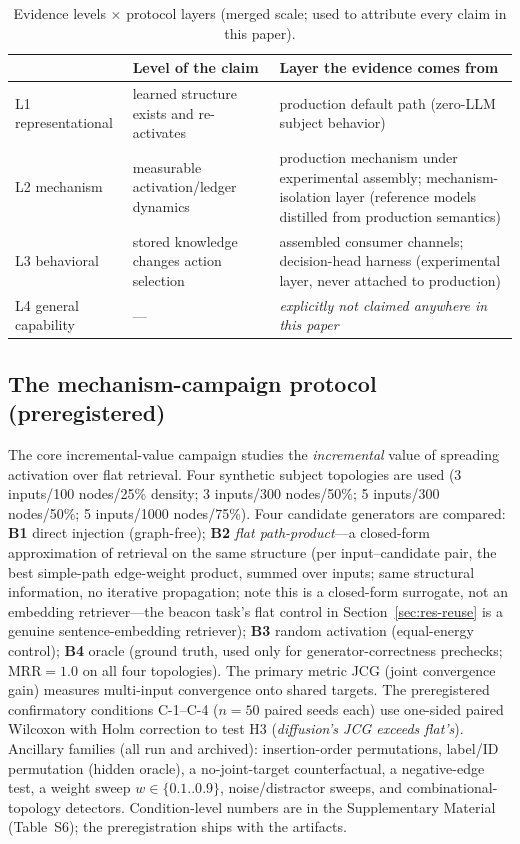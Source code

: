\documentclass[10pt,a4paper]{article}
\begin{document}
\begin{table}[t]
\centering\small
\caption{Evidence levels $\times$ protocol layers (merged scale; used to attribute every claim in this paper).}
\label{tab:evidence}
\begin{tabular}{L{3.2cm}L{4.4cm}L{6.4cm}}
\toprule
 & \textbf{Level of the claim} & \textbf{Layer the evidence comes from} \\
\midrule
L1 representational & learned structure exists and re-activates & production default path (zero-LLM subject behavior) \\
L2 mechanism & measurable activation/ledger dynamics & production mechanism under experimental assembly; mechanism-isolation layer (reference models distilled from production semantics) \\
L3 behavioral & stored knowledge changes action selection & assembled consumer channels; decision-head harness (experimental layer, never attached to production) \\
L4 general capability & --- & \emph{explicitly not claimed anywhere in this paper} \\
\bottomrule
\end{tabular}
\end{table}

\subsection{The mechanism-campaign protocol (preregistered)}
\label{sec:method-civ}
The core incremental-value campaign studies the \emph{incremental} value of spreading activation over flat retrieval. Four synthetic subject topologies are used (3 inputs/100 nodes/25\% density; 3 inputs/300 nodes/50\%; 5 inputs/300 nodes/50\%; 5 inputs/1000 nodes/75\%). Four candidate generators are compared: \textbf{B1} direct injection (graph-free); \textbf{B2} \emph{flat path-product}---a closed-form approximation of retrieval on the same structure (per input--candidate pair, the best simple-path edge-weight product, summed over inputs; same structural information, no iterative propagation; note this is a closed-form surrogate, not an embedding retriever---the beacon task's flat control in Section~\ref{sec:res-reuse} is a genuine sentence-embedding retriever); \textbf{B3} random activation (equal-energy control); \textbf{B4} oracle (ground truth, used only for generator-correctness prechecks; MRR${=}1.0$ on all four topologies). The primary metric JCG (joint convergence gain) measures multi-input convergence onto shared targets. The preregistered confirmatory conditions C-1--C-4 ($n{=}50$ paired seeds each) use one-sided paired Wilcoxon with Holm correction to test H3 (\emph{diffusion's JCG exceeds flat's}). Ancillary families (all run and archived): insertion-order permutations, label/ID permutation (hidden oracle), a no-joint-target counterfactual, a negative-edge test, a weight sweep $w\in\{0.1..0.9\}$, noise/distractor sweeps, and combinational-topology detectors. Condition-level numbers are in the Supplementary Material (Table~S6); the preregistration ships with the artifacts.
\end{document}
